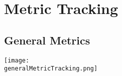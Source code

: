 %
% 
% 
%
%
\section{Metric Tracking}

\subsection{General Metrics}

\begin{center}
\texttt{[image: \\generalMetricTracking.png]}
\end{center}

